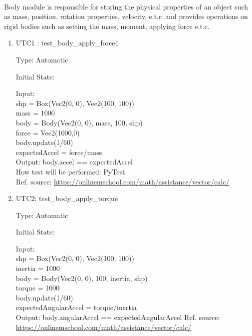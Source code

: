 \documentclass[12pt, titlepage]{article}
\begin{document}
\paragraph{}
Body module is responsible for storing the physical properties of an object such as mass, position, rotation properties, velocity, e.t.c\ and provides operations on rigid bodies such as setting the mass, moment, applying force e.t.c.
\begin{enumerate}
	

\item{UTC1} {: test\_body\_apply\_force1 \\}

Type: Automatic.
					
Initial State: 
					
Input: \\
shp = Box(Vec2(0, 0), Vec2(100, 100))\\
mass = 1000\\
body = Body(Vec2(0, 0), mass, 100, shp)\\
force = Vec2(1000,0)\\
body.update(1/60)\\
expectedAccel = force/mass\\
					
Output: body.accel == expectedAccel\\	
How test will be performed: PyTest\\ 
Ref. source: \url{https://onlinemschool.com/math/assistance/vector/calc/}
					
\item{UTC2}{: test\_body\_apply\_torque\\}

Type: Automatic
					
Initial State: 
					
Input: \\
shp = Box(Vec2(0, 0), Vec2(100, 100))\\
inertia = 1000\\
body = Body(Vec2(0, 0), 100, inertia, shp)\\
torque = 1000\\
body.update(1/60)\\
expectedAngularAccel = torque/inertia\\
					
Output: body.angularAccel == expectedAngularAccel
Ref. source: \url{https://onlinemschool.com/math/assistance/vector/calc/}


\end{enumerate}
\end{document}
